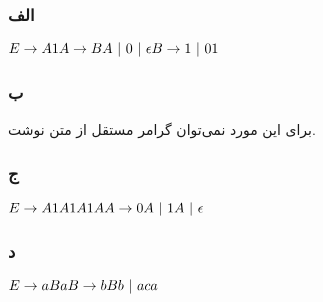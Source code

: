\subsubsection*{الف}
\setLTR
$
E \rightarrow A1 \\
A \rightarrow BA \ | \ 0 \ | \ \epsilon \\
B \rightarrow 1 \ | \ 01
$
\setRTL


\subsubsection*{ب}
برای این مورد نمی‌توان گرامر مستقل از متن نوشت.

\subsubsection*{ج}
\setLTR
$
E \rightarrow A1A1A1A \\
A \rightarrow 0A \ | \ 1A \ | \ \epsilon
$
\setRTL

\subsubsection*{د}
\setLTR
$
E \rightarrow aBa \\
B \rightarrow bBb \ | \ aca
$
\setRTL